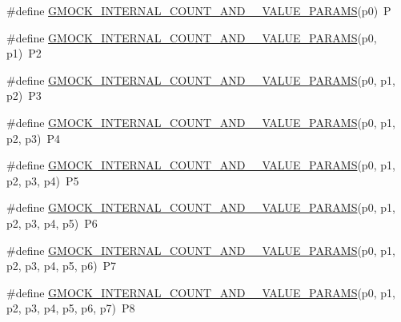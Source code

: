 \begin{DoxyCompactItemize}
\item 
\#define \mbox{\hyperlink{_obj__test_2lib_2googletest-release-1_88_81_2googlemock_2include_2gmock_2gmock-generated-actions_8h_a372a4dbbfeba17c2af89aa1027cb7f67}{G\+M\+O\+C\+K\+\_\+\+I\+N\+T\+E\+R\+N\+A\+L\+\_\+\+C\+O\+U\+N\+T\+\_\+\+A\+N\+D\+\_\+\_\+\+V\+A\+L\+U\+E\+\_\+\+P\+A\+R\+A\+MS}}(p0)~P
\item 
\#define \mbox{\hyperlink{_obj__test_2lib_2googletest-release-1_88_81_2googlemock_2include_2gmock_2gmock-generated-actions_8h_a58ef57d40fec061e17fdcbf020b77e20}{G\+M\+O\+C\+K\+\_\+\+I\+N\+T\+E\+R\+N\+A\+L\+\_\+\+C\+O\+U\+N\+T\+\_\+\+A\+N\+D\+\_\+\_\+\+V\+A\+L\+U\+E\+\_\+\+P\+A\+R\+A\+MS}}(p0,  p1)~P2
\item 
\#define \mbox{\hyperlink{_obj__test_2lib_2googletest-release-1_88_81_2googlemock_2include_2gmock_2gmock-generated-actions_8h_a43c845e4e60b3e17c4e312bbc5a8bb66}{G\+M\+O\+C\+K\+\_\+\+I\+N\+T\+E\+R\+N\+A\+L\+\_\+\+C\+O\+U\+N\+T\+\_\+\+A\+N\+D\+\_\+\_\+\+V\+A\+L\+U\+E\+\_\+\+P\+A\+R\+A\+MS}}(p0,  p1,  p2)~P3
\item 
\#define \mbox{\hyperlink{_obj__test_2lib_2googletest-release-1_88_81_2googlemock_2include_2gmock_2gmock-generated-actions_8h_aeb588496af9fc2b8e3c4702dac7e966e}{G\+M\+O\+C\+K\+\_\+\+I\+N\+T\+E\+R\+N\+A\+L\+\_\+\+C\+O\+U\+N\+T\+\_\+\+A\+N\+D\+\_\+\_\+\+V\+A\+L\+U\+E\+\_\+\+P\+A\+R\+A\+MS}}(p0,  p1,  p2,  p3)~P4
\item 
\#define \mbox{\hyperlink{_obj__test_2lib_2googletest-release-1_88_81_2googlemock_2include_2gmock_2gmock-generated-actions_8h_a29d90b8cedec75d4acbf2df27ef0e3b5}{G\+M\+O\+C\+K\+\_\+\+I\+N\+T\+E\+R\+N\+A\+L\+\_\+\+C\+O\+U\+N\+T\+\_\+\+A\+N\+D\+\_\+\_\+\+V\+A\+L\+U\+E\+\_\+\+P\+A\+R\+A\+MS}}(p0,  p1,  p2,  p3,  p4)~P5
\item 
\#define \mbox{\hyperlink{_obj__test_2lib_2googletest-release-1_88_81_2googlemock_2include_2gmock_2gmock-generated-actions_8h_ab79feaedfcef7df29e87695b82e9b65d}{G\+M\+O\+C\+K\+\_\+\+I\+N\+T\+E\+R\+N\+A\+L\+\_\+\+C\+O\+U\+N\+T\+\_\+\+A\+N\+D\+\_\+\_\+\+V\+A\+L\+U\+E\+\_\+\+P\+A\+R\+A\+MS}}(p0,  p1,  p2,  p3,  p4,  p5)~P6
\item 
\#define \mbox{\hyperlink{_obj__test_2lib_2googletest-release-1_88_81_2googlemock_2include_2gmock_2gmock-generated-actions_8h_ab4b49f0cdb482c0d7a6249607ac44f24}{G\+M\+O\+C\+K\+\_\+\+I\+N\+T\+E\+R\+N\+A\+L\+\_\+\+C\+O\+U\+N\+T\+\_\+\+A\+N\+D\+\_\+\_\+\+V\+A\+L\+U\+E\+\_\+\+P\+A\+R\+A\+MS}}(p0,  p1,  p2,  p3,  p4,  p5,  p6)~P7
\item 
\#define \mbox{\hyperlink{_obj__test_2lib_2googletest-release-1_88_81_2googlemock_2include_2gmock_2gmock-generated-actions_8h_a461b026c9cc310c199ab1f0b59111e5a}{G\+M\+O\+C\+K\+\_\+\+I\+N\+T\+E\+R\+N\+A\+L\+\_\+\+C\+O\+U\+N\+T\+\_\+\+A\+N\+D\+\_\+\_\+\+V\+A\+L\+U\+E\+\_\+\+P\+A\+R\+A\+MS}}(p0,  p1,  p2,  p3,  p4,  p5,  p6,  p7)~P8

\end{DoxyCompactItemize}
